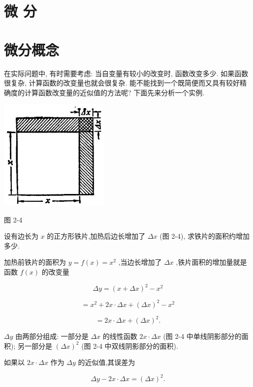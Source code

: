\documentclass[lang=cn,newtx,10pt,scheme=chinese]{elegantbook}
\begin{document}
\section*{微 分}

\section{微分概念}

在实际问题中, 有时需要考虑: 当自变量有较小的改变时, 函数改变多少. 如果函数很复杂, 计算函数的改变量也就会很复杂. 能不能找到一个既简便而又具有较好精确度的计算函数改变量的近似值的方法呢? 下面先来分析一个实例.

\begin{center}
\includegraphics[max width=0.4\textwidth]{images/01912c18-5c3f-733d-b775-749ba9897a9d_110_353714.jpg}
\end{center}

图 2-4

设有边长为 \(x\) 的正方形铁片,加热后边长增加了 \({\Delta x}\) (图 2-4), 求铁片的面积约增加多少.

加热前铁片的面积为 \(y = f\left( x\right) = {x}^{2}\) ,当边长增加了 \({\Delta x}\) ,铁片面积的增加量就是函数 \(f\left( x\right)\) 的改变量

\[
{\Delta y} = {\left( x + \Delta x\right) }^{2} - {x}^{2}
\]

\[
= {x}^{2} + {2x} \cdot {\Delta x} + {\left( \Delta x\right) }^{2} - {x}^{2}
\]

\[
= {2x} \cdot {\Delta x} + {\left( \Delta x\right) }^{2}\text{.} \tag{1}
\]

\({\Delta y}\) 由两部分组成: 一部分是 \({\Delta x}\) 的线性函数 \({2x} \cdot {\Delta x}\) (图 2-4 中单线阴影部分的面积); 另一部分是 \({\left( \Delta x\right) }^{2}\) (图 2-4 中双线阴影部分的面积).

如果以 \({2x} \cdot {\Delta x}\) 作为 \({\Delta y}\) 的近似值,其误差为

\[
{\Delta y} - {2x} \cdot {\Delta x} = {\left( \Delta x\right) }^{2}.
\]
\end{document}
